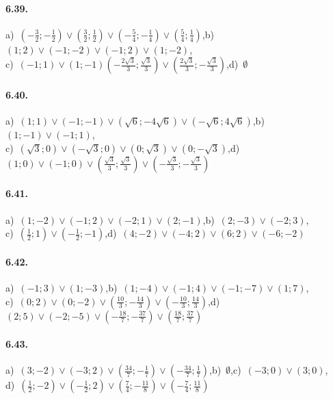 \paragraph{6.39.} a)~$\left(-\frac 3 2;-\frac 1 2\right)\vee\left(\frac 3 2;\frac 1 2\right)\vee\left(-\frac 5 4;-\frac 1 4\right)\vee\left(\frac 5 4;\frac 1 4\right)$,\quad b)~$(1;2)\vee(-1;-2)\vee (-1;2)\vee (1;-2)$,\protect\\
\quad c)~$(-1;1)\vee (1;-1)\left(-\frac{2\sqrt 3} 3;\frac{\sqrt 3} 3\right)\vee\left(\frac{2\sqrt 3} 3;-\frac{\sqrt 3} 3\right)$,\quad d)~$\emptyset$

\paragraph{6.40.} a)~$(1;1)\vee(-1;-1)\vee\left(\sqrt 6;-4\sqrt 6\right)\vee\left(-\sqrt 6;4\sqrt 6\right)$,\quad b)~$(1;-1)\vee(-1;1)$,\protect\\
\quad c)~$(\sqrt 3;0)\vee (-\sqrt 3;0)\vee (0;\sqrt 3)\vee (0;-\sqrt 3)$,\quad d)~$(1;0)\vee (-1;0)\vee\left(\frac{\sqrt 3} 3;\frac{\sqrt 3} 3\right)\vee\left(-\frac{\sqrt 3} 3;-\frac{\sqrt 3} 3\right)$

\paragraph{6.41.} a)~$(1;-2)\vee(-1;2)\vee (-2;1)\vee (2;-1)$,\quad b)~$(2;-3)\vee(-2;3)$,\protect\\
\quad c)~$\left(\frac 1 2;1\right)\vee \left(-\frac 1 2;-1\right)$,\quad d)~$(4;-2)\vee(-4;2)\vee (6;2)\vee (-6;-2)$

\paragraph{6.42.} a)~$(-1;3)\vee(1;-3)$,\quad b)~$(1;-4)\vee(-1;4)\vee (-1;-7)\vee (1;7)$,\protect\\
\quad c)~$(0;2)\vee (0;-2)\vee \left(\frac{10} 3;-\frac{14} 3\right)\vee \left(-\frac{10} 3;\frac{14} 3\right)$,\quad d)~$(2;5)\vee (-2;-5)\vee \left(-\frac{18} 7;-\frac{37} 7\right)\vee \left(\frac{18} 7;\frac{37} 7\right)$

\paragraph{6.43.} a)~$(3;-2)\vee(-3;2)\vee\left(\frac{34} 7;-\frac 1 7\right)\vee \left(-\frac{34} 7;\frac 1 7\right)$,\quad b)~$\emptyset$,\quad c)~$(-3;0)\vee(3;0)$,\protect\\
\quad d)~$\left(\frac 1 2;-2\right)\vee\left(-\frac 1 2;2\right)\vee\left(\frac 7 4;-\frac{11} 8\right)\vee\left(-\frac 7 4;\frac{11} 8\right)$

